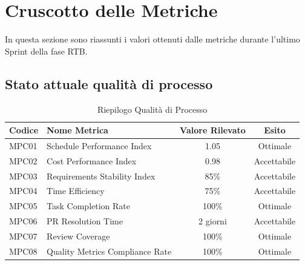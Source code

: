 \section{Cruscotto delle Metriche}
In questa sezione sono riassunti i valori ottenuti dalle metriche durante l'ultimo Sprint della fase RTB.

\subsection{Stato attuale qualità di processo}
\begin{table}[H]
    \centering
    \renewcommand{\arraystretch}{1.3}
    \begin{tabularx}{\textwidth}{|l|X|c|c|}
        \hline
        \rowcolor{primarycolor!10}
        \textbf{Codice} & \textbf{Nome Metrica} & \textbf{Valore Rilevato} & \textbf{Esito} \\
        \hline
        MPC01 & Schedule Performance Index & 1.05 & Ottimale \\
        \hline
        MPC02 & Cost Performance Index & 0.98 & Accettabile \\
        \hline
        MPC03 & Requirements Stability Index & 85\% & Accettabile \\
        \hline
        MPC04 & Time Efficiency & 75\% & Accettabile \\
        \hline
        MPC05 & Task Completion Rate & 100\% & Ottimale \\
        \hline
        MPC06 & PR Resolution Time & 2 giorni & Accettabile \\
        \hline
        MPC07 & Review Coverage & 100\% & Ottimale \\
        \hline
        MPC08 & Quality Metrics Compliance Rate & 100\% & Ottimale \\
        \hline
    \end{tabularx}
    \caption{Riepilogo Qualità di Processo}
\end{table}

